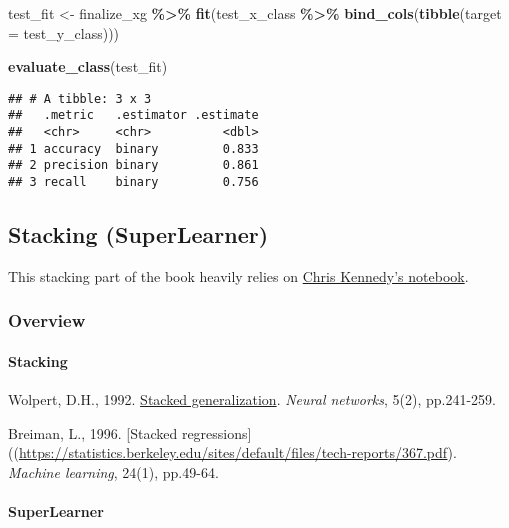 \documentclass[
]{book}
\newenvironment{Shaded}{\begin{snugshade}}{\end{snugshade}}
\newcommand{\DataTypeTok}[1]{\textcolor[rgb]{0.13,0.29,0.53}{#1}}
\newcommand{\KeywordTok}[1]{\textcolor[rgb]{0.13,0.29,0.53}{\textbf{#1}}}
\newcommand{\NormalTok}[1]{#1}
\newcommand{\OperatorTok}[1]{\textcolor[rgb]{0.81,0.36,0.00}{\textbf{#1}}}
\newcommand{\StringTok}[1]{\textcolor[rgb]{0.31,0.60,0.02}{#1}}
\begin{document}
\begin{Shaded}
\begin{Highlighting}[]
\NormalTok{test\_fit \textless{}{-}}\StringTok{ }\NormalTok{finalize\_xg }\OperatorTok{\%\textgreater{}\%}
\StringTok{  }\KeywordTok{fit}\NormalTok{(test\_x\_class }\OperatorTok{\%\textgreater{}\%}\StringTok{ }\KeywordTok{bind\_cols}\NormalTok{(}\KeywordTok{tibble}\NormalTok{(}\DataTypeTok{target =}\NormalTok{ test\_y\_class)))}

\KeywordTok{evaluate\_class}\NormalTok{(test\_fit)}
\end{Highlighting}
\end{Shaded}

\begin{verbatim}
## # A tibble: 3 x 3
##   .metric   .estimator .estimate
##   <chr>     <chr>          <dbl>
## 1 accuracy  binary         0.833
## 2 precision binary         0.861
## 3 recall    binary         0.756
\end{verbatim}

\hypertarget{stacking-superlearner}{%
\subsection{Stacking (SuperLearner)}\label{stacking-superlearner}}

This stacking part of the book heavily relies on \href{https://github.com/dlab-berkeley/Machine-Learning-in-R/blob/master/07-ensembles.Rmd}{Chris Kennedy's notebook}.

\hypertarget{overview-1}{%
\subsubsection{Overview}\label{overview-1}}

\hypertarget{stacking}{%
\paragraph{Stacking}\label{stacking}}

Wolpert, D.H., 1992. \href{http://citeseerx.ist.psu.edu/viewdoc/summary?doi=10.1.1.56.1533}{Stacked generalization}. \emph{Neural networks}, 5(2), pp.241-259.

Breiman, L., 1996. {[}Stacked regressions{]}((\url{https://statistics.berkeley.edu/sites/default/files/tech-reports/367.pdf}). \emph{Machine learning}, 24(1), pp.49-64.

\hypertarget{superlearner}{%
\paragraph{SuperLearner}\label{superlearner}}
\end{document}
